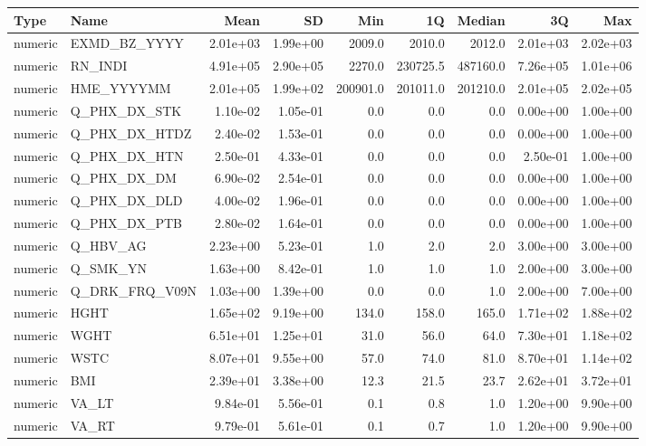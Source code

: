 \documentclass{article}
\begin{document}
\begin{longtable}{l|l|r|r|r|r|r|r|r}
\hline
Type & Name & Mean & SD & Min & 1Q & Median & 3Q & Max\\
\hline
numeric & EXMD\_BZ\_YYYY & 2.01e+03 & 1.99e+00 & 2009.0 & 2010.0 & 2012.0 & 2.01e+03 & 2.02e+03\\
\hline
numeric & RN\_INDI & 4.91e+05 & 2.90e+05 & 2270.0 & 230725.5 & 487160.0 & 7.26e+05 & 1.01e+06\\
\hline
numeric & HME\_YYYYMM & 2.01e+05 & 1.99e+02 & 200901.0 & 201011.0 & 201210.0 & 2.01e+05 & 2.02e+05\\
\hline
numeric & Q\_PHX\_DX\_STK & 1.10e-02 & 1.05e-01 & 0.0 & 0.0 & 0.0 & 0.00e+00 & 1.00e+00\\
\hline
numeric & Q\_PHX\_DX\_HTDZ & 2.40e-02 & 1.53e-01 & 0.0 & 0.0 & 0.0 & 0.00e+00 & 1.00e+00\\
\hline
numeric & Q\_PHX\_DX\_HTN & 2.50e-01 & 4.33e-01 & 0.0 & 0.0 & 0.0 & 2.50e-01 & 1.00e+00\\
\hline
numeric & Q\_PHX\_DX\_DM & 6.90e-02 & 2.54e-01 & 0.0 & 0.0 & 0.0 & 0.00e+00 & 1.00e+00\\
\hline
numeric & Q\_PHX\_DX\_DLD & 4.00e-02 & 1.96e-01 & 0.0 & 0.0 & 0.0 & 0.00e+00 & 1.00e+00\\
\hline
numeric & Q\_PHX\_DX\_PTB & 2.80e-02 & 1.64e-01 & 0.0 & 0.0 & 0.0 & 0.00e+00 & 1.00e+00\\
\hline
numeric & Q\_HBV\_AG & 2.23e+00 & 5.23e-01 & 1.0 & 2.0 & 2.0 & 3.00e+00 & 3.00e+00\\
\hline
numeric & Q\_SMK\_YN & 1.63e+00 & 8.42e-01 & 1.0 & 1.0 & 1.0 & 2.00e+00 & 3.00e+00\\
\hline
numeric & Q\_DRK\_FRQ\_V09N & 1.03e+00 & 1.39e+00 & 0.0 & 0.0 & 1.0 & 2.00e+00 & 7.00e+00\\
\hline
numeric & HGHT & 1.65e+02 & 9.19e+00 & 134.0 & 158.0 & 165.0 & 1.71e+02 & 1.88e+02\\
\hline
numeric & WGHT & 6.51e+01 & 1.25e+01 & 31.0 & 56.0 & 64.0 & 7.30e+01 & 1.18e+02\\
\hline
numeric & WSTC & 8.07e+01 & 9.55e+00 & 57.0 & 74.0 & 81.0 & 8.70e+01 & 1.14e+02\\
\hline
numeric & BMI & 2.39e+01 & 3.38e+00 & 12.3 & 21.5 & 23.7 & 2.62e+01 & 3.72e+01\\
\hline
numeric & VA\_LT & 9.84e-01 & 5.56e-01 & 0.1 & 0.8 & 1.0 & 1.20e+00 & 9.90e+00\\
\hline
numeric & VA\_RT & 9.79e-01 & 5.61e-01 & 0.1 & 0.7 & 1.0 & 1.20e+00 & 9.90e+00\\

\end{longtable}
\end{document}
